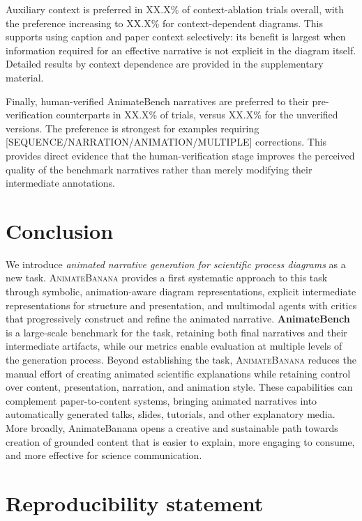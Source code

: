\documentclass{article} %
\begin{document}
Auxiliary context is preferred in XX.X\% of context-ablation trials overall,
with the preference increasing to XX.X\% for context-dependent diagrams.
This supports using caption and paper context selectively: its benefit is
largest when information required for an effective narrative is not explicit
in the diagram itself. Detailed results by context dependence are provided in
the supplementary material.

Finally, human-verified AnimateBench narratives are preferred to their
pre-verification counterparts in XX.X\% of trials, versus XX.X\% for the
unverified versions. The preference is strongest for examples requiring
[SEQUENCE/NARRATION/ANIMATION/MULTIPLE] corrections. This provides direct
evidence that the human-verification stage improves the perceived quality of
the benchmark narratives rather than merely modifying their intermediate
annotations.

\section{Conclusion}

We introduce \emph{animated narrative generation for scientific process diagrams} as a new
task. \textsc{AnimateBanana} provides a
first systematic approach to this task through symbolic, animation-aware
diagram representations, explicit intermediate representations for structure
and presentation, and multimodal agents with critics that progressively
construct and refine the animated narrative. \textbf{AnimateBench} is a
large-scale benchmark for the task, retaining both final narratives and their
intermediate artifacts, while our metrics enable evaluation at multiple levels
of the generation process.
Beyond establishing the task, \textsc{AnimateBanana} reduces the manual effort
of creating animated scientific explanations while retaining control over
content, presentation, narration, and animation style. These capabilities
can complement paper-to-content systems, bringing animated narratives into
automatically generated talks, slides, tutorials, and other explanatory media. More broadly, AnimateBanana opens a creative and sustainable path towards creation of grounded content that is easier to explain, more engaging to consume, and more effective for science communication.



\section*{Reproducibility statement}
\end{document}
